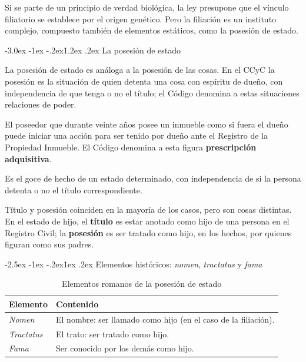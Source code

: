 \documentclass[12pt,oneside]{book}
\makeatletter
\renewcommand\section{\@startsection{section}{1}{\z@}%
  {-3.0ex \@plus -1ex \@minus -.2ex}{1.2ex \@plus .2ex}%
  {\normalfont\large\bfseries\color{acento}}}
\renewcommand\subsection{\@startsection{subsection}{2}{\z@}%
  {-2.5ex \@plus -1ex \@minus -.2ex}{1ex \@plus .2ex}%
  {\normalfont\normalsize\bfseries}}
\makeatother
\begin{document}
\begin{importante}
Si se parte de un principio de verdad biológica, la ley presupone que el vínculo filiatorio se establece por el origen genético. Pero la filiación es un instituto complejo, compuesto también de elementos estáticos, como la posesión de estado.
\end{importante}

\section{La posesión de estado}

La posesión de estado es análoga a la posesión de las cosas. En el CCyC la posesión es la situación de quien detenta una cosa con espíritu de dueño, con independencia de que tenga o no el título; el Código denomina a estas situaciones relaciones de poder.

\begin{ejemplo}
El poseedor que durante veinte años posee un inmueble como si fuera el dueño puede iniciar una acción para ser tenido por dueño ante el Registro de la Propiedad Inmueble. El Código denomina a esta figura \textbf{prescripción adquisitiva}.
\end{ejemplo}

\begin{definicion}
Es el goce de hecho de un estado determinado, con independencia de si la persona detenta o no el título correspondiente.
\end{definicion}

\begin{importante}
Título y posesión coinciden en la mayoría de los casos, pero son cosas distintas. En el estado de hijo, el \textbf{título} es estar anotado como hijo de una persona en el Registro Civil; la \textbf{posesión} es ser tratado como hijo, en los hechos, por quienes figuran como sus padres.
\end{importante}

\subsection{Elementos históricos: \textit{nomen}, \textit{tractatus} y \textit{fama}}

\begin{table}[H]
\centering
\begin{tabularx}{\textwidth}{B{0.20\textwidth} Y}
\toprule
\textbf{Elemento} & \textbf{Contenido} \\
\midrule
\textit{Nomen} & El nombre: ser llamado como hijo (en el caso de la filiación). \\
\textit{Tractatus} & El trato: ser tratado como hijo. \\
\textit{Fama} & Ser conocido por los demás como hijo. \\
\bottomrule
\end{tabularx}
\caption{Elementos romanos de la posesión de estado}
\end{table}
\end{document}
